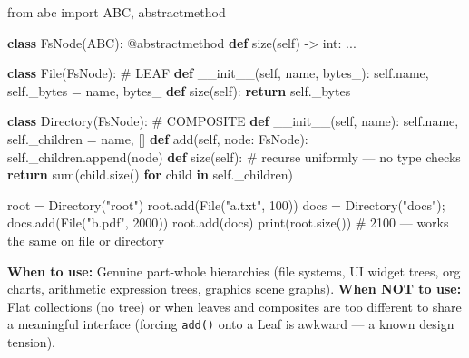 \documentclass[11pt]{article}
\newenvironment{Shaded}{\begin{snugshade}}{\end{snugshade}}
\newcommand{\AttributeTok}[1]{\textcolor[rgb]{0.16,0.50,0.73}{#1}}
\newcommand{\BuiltInTok}[1]{\textcolor[rgb]{0.50,0.55,0.55}{#1}}
\newcommand{\CommentTok}[1]{\textcolor[rgb]{0.48,0.49,0.49}{#1}}
\newcommand{\ControlFlowTok}[1]{\textcolor[rgb]{0.99,0.74,0.29}{\textbf{#1}}}
\newcommand{\DecValTok}[1]{\textcolor[rgb]{0.96,0.45,0.00}{#1}}
\newcommand{\FunctionTok}[1]{\textcolor[rgb]{0.56,0.27,0.68}{#1}}
\newcommand{\ImportTok}[1]{\textcolor[rgb]{0.15,0.68,0.38}{#1}}
\newcommand{\KeywordTok}[1]{\textcolor[rgb]{0.81,0.81,0.76}{\textbf{#1}}}
\newcommand{\NormalTok}[1]{\textcolor[rgb]{0.81,0.81,0.76}{#1}}
\newcommand{\OperatorTok}[1]{\textcolor[rgb]{0.81,0.81,0.76}{#1}}
\newcommand{\StringTok}[1]{\textcolor[rgb]{0.96,0.31,0.31}{#1}}
\newcommand{\VariableTok}[1]{\textcolor[rgb]{0.15,0.68,0.68}{#1}}
\begin{document}
\begin{Shaded}
\begin{Highlighting}[]
\ImportTok{from}\NormalTok{ abc }\ImportTok{import}\NormalTok{ ABC, abstractmethod}

\KeywordTok{class}\NormalTok{ FsNode(ABC):}
    \AttributeTok{@abstractmethod}
    \KeywordTok{def}\NormalTok{ size(}\VariableTok{self}\NormalTok{) }\OperatorTok{{-}\textgreater{}} \BuiltInTok{int}\NormalTok{: ...}

\KeywordTok{class}\NormalTok{ File(FsNode):                      }\CommentTok{\# LEAF}
    \KeywordTok{def} \FunctionTok{\_\_init\_\_}\NormalTok{(}\VariableTok{self}\NormalTok{, name, bytes\_): }\VariableTok{self}\NormalTok{.name, }\VariableTok{self}\NormalTok{.\_bytes }\OperatorTok{=}\NormalTok{ name, bytes\_}
    \KeywordTok{def}\NormalTok{ size(}\VariableTok{self}\NormalTok{): }\ControlFlowTok{return} \VariableTok{self}\NormalTok{.\_bytes}

\KeywordTok{class}\NormalTok{ Directory(FsNode):                  }\CommentTok{\# COMPOSITE}
    \KeywordTok{def} \FunctionTok{\_\_init\_\_}\NormalTok{(}\VariableTok{self}\NormalTok{, name): }\VariableTok{self}\NormalTok{.name, }\VariableTok{self}\NormalTok{.\_children }\OperatorTok{=}\NormalTok{ name, []}
    \KeywordTok{def}\NormalTok{ add(}\VariableTok{self}\NormalTok{, node: FsNode): }\VariableTok{self}\NormalTok{.\_children.append(node)}
    \KeywordTok{def}\NormalTok{ size(}\VariableTok{self}\NormalTok{):                       }\CommentTok{\# recurse uniformly — no type checks}
        \ControlFlowTok{return} \BuiltInTok{sum}\NormalTok{(child.size() }\ControlFlowTok{for}\NormalTok{ child }\KeywordTok{in} \VariableTok{self}\NormalTok{.\_children)}

\NormalTok{root }\OperatorTok{=}\NormalTok{ Directory(}\StringTok{"root"}\NormalTok{)}
\NormalTok{root.add(File(}\StringTok{"a.txt"}\NormalTok{, }\DecValTok{100}\NormalTok{))}
\NormalTok{docs }\OperatorTok{=}\NormalTok{ Directory(}\StringTok{"docs"}\NormalTok{)}\OperatorTok{;}\NormalTok{ docs.add(File(}\StringTok{"b.pdf"}\NormalTok{, }\DecValTok{2000}\NormalTok{))}
\NormalTok{root.add(docs)}
\BuiltInTok{print}\NormalTok{(root.size())   }\CommentTok{\# 2100 — works the same on file or directory}
\end{Highlighting}
\end{Shaded}

\textbf{When to use:} Genuine part-whole hierarchies (file systems, UI widget trees, org charts, arithmetic expression trees, graphics scene graphs). \textbf{When NOT to use:} Flat collections (no tree) or when leaves and composites are too different to share a meaningful interface (forcing \texttt{add()} onto a Leaf is awkward --- a known design tension).
\end{document}
